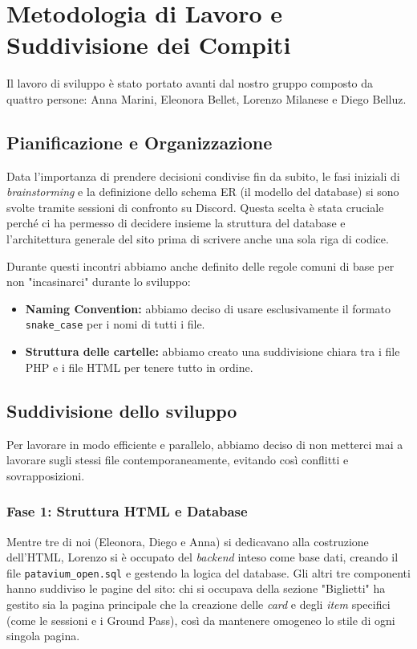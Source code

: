 \documentclass[11pt,a4paper]{article}
\begin{document}
\section{Metodologia di Lavoro e Suddivisione dei Compiti}

Il lavoro di sviluppo è stato portato avanti dal nostro gruppo composto da quattro persone: Anna Marini, Eleonora Bellet, Lorenzo Milanese e Diego Belluz. 

\subsection{Pianificazione e Organizzazione}
Data l'importanza di prendere decisioni condivise fin da subito, le fasi iniziali di \textit{brainstorming} e la definizione dello schema ER (il modello del database) si sono svolte tramite sessioni di confronto su Discord. Questa scelta è stata cruciale perché ci ha permesso di decidere insieme la struttura del database e l'architettura generale del sito prima di scrivere anche una sola riga di codice. 

Durante questi incontri abbiamo anche definito delle regole comuni di base per non "incasinarci" durante lo sviluppo:
\begin{itemize}
    \item \textbf{Naming Convention:} abbiamo deciso di usare esclusivamente il formato \texttt{snake\_case} per i nomi di tutti i file.
    \item \textbf{Struttura delle cartelle:} abbiamo creato una suddivisione chiara tra i file PHP e i file HTML per tenere tutto in ordine.
\end{itemize}

\subsection{Suddivisione dello sviluppo}
Per lavorare in modo efficiente e parallelo, abbiamo deciso di non metterci mai a lavorare sugli stessi file contemporaneamente, evitando così conflitti e sovrapposizioni.

\subsubsection{Fase 1: Struttura HTML e Database}
Mentre tre di noi (Eleonora, Diego e Anna) si dedicavano alla costruzione dell'HTML, Lorenzo si è occupato del \textit{backend} inteso come base dati, creando il file \texttt{patavium\_open.sql} e gestendo la logica del database. 
Gli altri tre componenti hanno suddiviso le pagine del sito: chi si occupava della sezione "Biglietti" ha gestito sia la pagina principale che la creazione delle \textit{card} e degli \textit{item} specifici (come le sessioni e i Ground Pass), così da mantenere omogeneo lo stile di ogni singola pagina.
\end{document}
